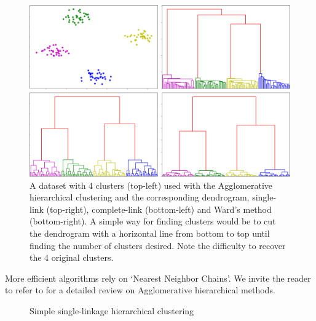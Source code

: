  \begin{figure}[h]
 \center
 \includegraphics[scale=0.35]{TeX_files/dendrogram.png}
 \caption{A dataset with 4 clusters (top-left) used with the Agglomerative hierarchical clustering and the corresponding dendrogram, single-link (top-right), complete-link (bottom-left) and Ward's method (bottom-right). A simple way for finding clusters would be to cut the dendrogram with a horizontal line from bottom to top until finding the number of clusters desired. Note the difficulty to recover the 4 original clusters.}
 \label{dendrogram_graph}
 \end{figure}
 More efficient algorithms rely on `Nearest Neighbor Chains'. We invite the reader to refer to \citep{hierarchicalMurtagh} for a detailed review on Agglomerative hierarchical methods.

\begin{figure}[h]
\begin{center}
   \caption{Simple single-linkage hierarchical clustering}
   \label{algo:single_linkage_hier_algo}
\end{center}
\vspace{-15pt}
\end{figure}
